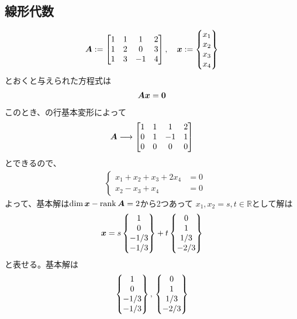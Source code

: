 \newpage
\subsection{線形代数}
\begin{ans*}
  \begin{gather}
    \bm{A} := \begin{bmatrix}
      1 & 1 & 1 & 2 \\
      1 & 2 & 0 & 3 \\
      1 & 3 & -1 & 4
    \end{bmatrix},\quad {\bm{x}} := \begin{Bmatrix}
      x_1 \\ x_2 \\ x_3 \\ x_4
    \end{Bmatrix}
  \end{gather}
  とおくと与えられた方程式は
  \begin{align}
    \bm{A} {\bm{x}} = \bm{0}
  \end{align}
  このとき、\bA の行基本変形によって
  \begin{gather}
    \bm{A} \longrightarrow
    \begin{bmatrix}
      1& 1& 1& 2 \\
      0& 1& -1& 1 \\
      0& 0& 0& 0 \\
    \end{bmatrix}
  \end{gather}
  とできるので、
  \begin{align}
    &\left\{
    \begin{aligned}
      x_1 + x_2 + x_3 + 2x_4 &= 0 \\
      x_2 - x_3 + x_4 &= 0
    \end{aligned}
    \right.
  \end{align}
  よって、基本解は$\dim{\bm{x}} - \operatorname{rank}\bm{A} = 2$から2つあって
  $x_1,x_2 = s,t \in \mathbb{R}$として解は
  \begin{align}
    {\bm{x}} = s
    \begin{Bmatrix}
      1 \\ 0 \\ -1/3 \\ -1/3
    \end{Bmatrix}
    + t
    \begin{Bmatrix}
      0 \\ 1 \\ 1/3 \\ -2/3
    \end{Bmatrix}
  \end{align}
  と表せる。基本解は
  \begin{align}
    \begin{Bmatrix}
      1 \\ 0 \\ -1/3 \\ -1/3
    \end{Bmatrix},\,
    \begin{Bmatrix}
      0 \\ 1 \\ 1/3 \\ -2/3
    \end{Bmatrix}
  \end{align}
\end{ans*}


